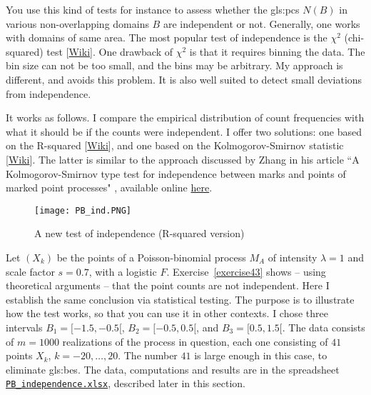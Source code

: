 \documentclass[10pt]{article}
\begin{document}
You use this kind of tests for instance to assess whether the \glspl{gls:pc} $N(B)$ in various non-overlapping domains $B$ 
are independent or not. Generally, one works with domains of same area. The most popular test of independence is the  
$\chi^2$ (chi-squared) test [\href{https://en.wikipedia.org/wiki/Chi-squared_test}{Wiki}]. One drawback of $\chi^2$ is that it requires binning the data. The bin size
can not be too small, and the bins may be arbitrary. My approach is different, and avoids this problem. It is also well suited to detect small deviations from
independence.  

It works as follows. I compare 
the empirical distribution of count frequencies with what it should be 
if the counts were independent. 
I offer two solutions: one based on the R-squared [\href{https://en.wikipedia.org/wiki/Coefficient_of_determination}{Wiki}], and one based on the 
\textcolor{index}{Kolmogorov-Smirnov statistic} [\href{https://bit.ly/3uJMMNK}{Wiki}]. The latter is similar to the approach discussed by Zhang 
 in his article ``A Kolmogorov-Smirnov type test for independence between marks and points of marked point processes" 
\cite{js2014}, 
available online \href{https://projecteuclid.org/journals/electronic-journal-of-statistics/volume-8/issue-2/A-Kolmogorov-Smirnov-type-test-for-independence-between-marks-and/10.1214/14-EJS961.full}{here}. 


\begin{figure}[H]
\centering
\texttt{[image: PB\_ind.PNG]}
\caption{A new test of independence (R-squared version)}
\label{fig:pbindp}
\end{figure}

Let $(X_k)$ be the points of a Poisson-binomial process $M_A$ of intensity $\lambda=1$ and scale factor $s=0.7$, with a logistic $F$.  Exercise~\ref{exercise43} shows -- using theoretical arguments -- that the point counts are not independent. Here I establish the same conclusion via statistical testing. The purpose is to
illustrate how the test works, so that you can use it in other contexts. I chose three intervals $B_1=[-1.5,-0.5[$, $B_2=[-0.5,0.5[$, and $B_3=[0.5, 1.5[$. The data consists of $m=\num{1000}$ realizations of the process in question, each one consisting of $41$ points 
$X_k$, $k=-20,\dots,20$. The number $41$ is large enough in this case, to eliminate \glspl{gls:be}. 
The data, computations and results are 
in the spreadsheet \href{https://github.com/VincentGranville/Point-Processes/tree/main/Spreadsheets}{\texttt{PB\_independence.xlsx}}, described later in this section.
\end{document}
